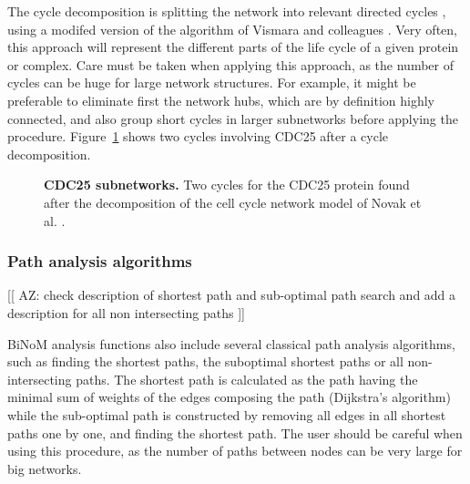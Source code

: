 \documentclass[10pt]{bmc_article}
\newenvironment{bmcformat}{\baselineskip20pt\sloppy\setboolean{publ}{false}}{\baselineskip20pt\sloppy}
\begin{document}
\begin{bmcformat}
The cycle decomposition is splitting the network into relevant directed cycles
\cite{gleiss2001relevant}, using a modifed version of the algorithm of Vismara
and colleagues \cite{vismara1997union}. Very often, this approach will represent
the different parts of the life cycle of a given protein or complex. Care must
be taken when applying this approach, as the number of cycles can be huge for
large network structures. For example, it might be preferable to eliminate first
the network hubs, which are by definition highly connected, and also group short
cycles in larger subnetworks before applying the procedure. Figure~\ref{mphasecdc25cycles} shows two
cycles involving CDC25 after a cycle decomposition.

\begin{figure}[h]
 \caption{\label{mphasecdc25cycles}  \textbf{CDC25 subnetworks.}
      Two cycles for the CDC25 protein found after the decomposition of the cell cycle network model of Novak et al. \cite{novak1998model}.}
\end{figure}




\subsubsection*{Path analysis algorithms}

[[ AZ: check description of shortest path and sub-optimal path search and add a description for all non intersecting paths ]]

BiNoM analysis functions also include several classical path analysis
algorithms, such as finding the shortest paths, the suboptimal shortest paths or
all non-intersecting paths. The shortest path is calculated as the path having
the minimal sum of weights of the edges composing the path (Dijkstra's
algorithm) while the sub-optimal path is constructed by removing all edges in
all shortest paths one by one, and finding the shortest path. The user should
be careful when using this procedure, as the number of paths between nodes can be
very large for big networks.


\end{bmcformat}
\end{document}
